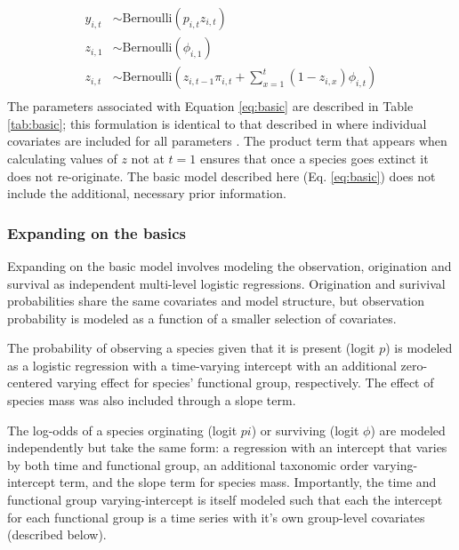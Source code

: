 \documentclass[12pt,letterpaper]{article}
\begin{document}
\begin{equation}
  \begin{aligned}
    y_{i, t} &\sim \text{Bernoulli}(p_{i, t} z_{i, t}) \\
    z_{i, 1} &\sim \text{Bernoulli}(\phi_{i, 1}) \\
    z_{i, t} &\sim \text{Bernoulli}\left(z_{i, t - 1} \pi_{i,t} + \sum_{x = 1}^{t}(1 - z_{i, x}) \phi_{i,t}\right) \\
  \end{aligned}
  \label{eq:basic}
\end{equation}
The parameters associated with Equation \ref{eq:basic} are described in Table \ref{tab:basic}; this formulation is identical to that described in where individual covariates are included for all parameters \citep{Royle2008}. The product term that appears when calculating values of \(z\) not at \(t = 1\) ensures that once a species goes extinct it does not re-originate. The basic model described here (Eq. \ref{eq:basic}) does not include the additional, necessary prior information. 


\subsubsection*{Expanding on the basics}
Expanding on the basic model involves modeling the observation, origination and survival as independent multi-level logistic regressions. Origination and surivival probabilities share the same covariates and model structure, but observation probability is modeled as a function of a smaller selection of covariates.

The probability of observing a species given that it is present (logit \(p\)) is modeled as a logistic regression with a time-varying intercept with an additional zero-centered varying effect for species' functional group, respectively. The effect of species mass was also included through a slope term.

The log-odds of a species orginating (logit \(pi\)) or surviving (logit \(\phi\)) are modeled independently but take the same form: a regression with an intercept that varies by both time and functional group, an additional taxonomic order varying-intercept term, and the slope term for species mass. Importantly, the time and functional group varying-intercept is itself modeled such that each the intercept for each functional group is a time series with it's own group-level covariates (described below). 
\end{document}

